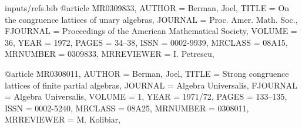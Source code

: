 \begin{filecontents*}{inputs/refs.bib}
@article {MR0309833,
    AUTHOR = {Berman, Joel},
     TITLE = {On the congruence lattices of unary algebras},
   JOURNAL = {Proc. Amer. Math. Soc.},
  FJOURNAL = {Proceedings of the American Mathematical Society},
    VOLUME = {36},
      YEAR = {1972},
     PAGES = {34--38},
      ISSN = {0002-9939},
   MRCLASS = {08A15},
  MRNUMBER = {0309833},
MRREVIEWER = {I. Petrescu},
}
		
@article {MR0308011,
    AUTHOR = {Berman, Joel},
     TITLE = {Strong congruence lattices of finite partial algebras},
   JOURNAL = {Algebra Universalis},
  FJOURNAL = {Algebra Universalis},
    VOLUME = {1},
      YEAR = {1971/72},
     PAGES = {133--135},
      ISSN = {0002-5240},
   MRCLASS = {08A25},
  MRNUMBER = {0308011},
MRREVIEWER = {M. Kolibiar},
}
		

\end{filecontents*}
